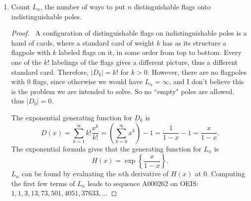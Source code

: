 \documentclass[12pt]{article}
\begin{document}
\begin{enumerate}[leftmargin=0cm,itemindent=.5cm,labelwidth=\itemindent,labelsep=0cm,align=left]
\begin{proof}
\begin{comment}
\hline 
$(x+1)(x^2 - x + 1)$ & $x^3 + 1$ & 2 \\ 
\hline 
$(x^2 + x + 1)(x^2 - x + 1)$ & $x^4 + x^2 + 1$ & 3 \\ 
\hline 
$(x+1)^2(x^2 + x + 1)$ & $x^4 + 3x^3 + 4x^2 + 3x + 1$ & 12 \\ 
\hline
$(x+1)(x^2 + x + 1)^2$ & $x^5 + 3x^4 + 5x^3 + 5x^2 + 3x + 1
$ & 18 \\ 
\hline 
$(x+1)^2(x^2 - x + 1)$  & $x^4 + x^3 + x + 1$ & 4 \\ 
\hline
$(x+1)(x^2 - x + 1)^2$  & $x^5 - x^4 + x^3 + x^2 - x + 1$ & not all positive \\ 
\hline 
$(x^2 + x + 1)^2(x^2 - x + 1)$ & $x^6 + x^5 + 2x^4 + x^3 + 2x^2 + x + 1$ & 9 \\ 
\hline 
$(x^2 - x + 1)^2(x^2 + x + 1)$ & $x^6 - x^5 + 2x^4 - x^3 + 2x^2 - x + 1$ & not all positive \\ 
\hline 
$\bold{(x+1)(x^2 + x + 1)(x^2 - x + 1)}$ & $\bold{x^5 + x^4 + x^3 + x^2 + x + 1}$ & \textbf{6} \\ 
\hline 
\end{tabular} 
\end{center}
\end{comment}
\end{proof}

\item Count $L_n$, the number of ways to put $n$ distinguishable flags onto indistinguishable poles.

\begin{proof}
\ A configuration of distinguishable flags on indistinguishable poles is a hand of cards, where a standard card of weight $k$ has as its structure a flagpole with $k$ labeled flags on it, in some order from top to bottom.  Every one of the $k!$ labelings of the flags gives a different picture, thus a different standard card.  Therefore, $|D_k| = k!$ for $k>0$.  However, there are no flagpoles with $0$ flags, since otherwise we would have $L_n = \infty$, and I don't believe this is the problem we are intended to solve.  So no ``empty" poles are allowed, thus $|D_0| = 0$.

The exponential generating function for $D_k$ is
$$D(x) = \sum_{k=1}^\infty k! \frac{x^k}{k!} = \left( \sum_{k=0}^\infty x^k \right) - 1 = \frac{1}{1-x} - 1 = \frac{x}{1-x}.$$
The exponential formula gives that the generating function for $L_n$ is
$$
H(x) = \exp\left\{\dfrac{x}{1-x}\right\}.
$$
$L_n$ can be found by evaluating the $n$th derivative of $H(x)$ at $0$.  Computing the first few terms of $L_n$ leads to sequence A000262 on OEIS: $1, 1, 3, 13, 73, 501, 4051, 37633, \dots$
\end{proof}


\end{enumerate}
\end{document}
